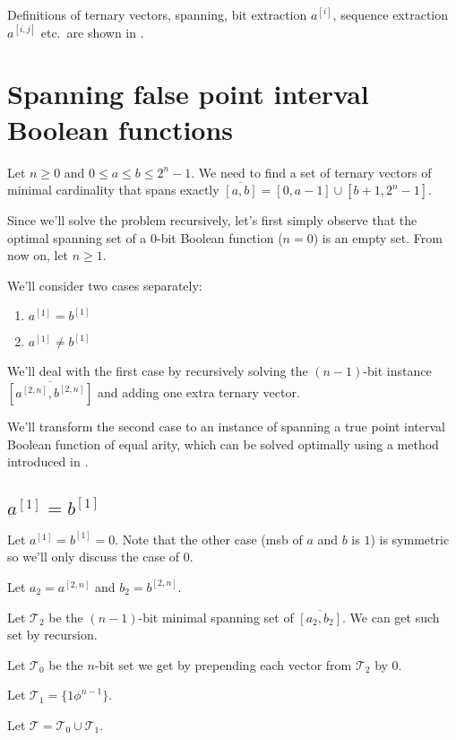 \documentclass{article}
\theoremstyle{plain}
\theoremstyle{definition}
\newcommand{\interval}[2]{[#1, #2]}
\newcommand{\finterval}[2]{\overline{\interval{#1}{#2}}}
\newcommand{\bit}[2]{#1^{[#2]}}
\newcommand{\bits}[3]{#1^{\interval{#2}{#3}}}
\begin{document}
Definitions of
ternary vectors,
spanning,
bit extraction $\bit{a}{i}$,
sequence extraction $\bits{a}{i}{j}$
etc.~are shown in \cite{Schieber2005154}.

\section{Spanning false point interval Boolean functions}
Let $n \geq 0$ and $0 \leq a \leq b \leq 2^n - 1$.
We need to find a set of ternary vectors of minimal cardinality
that spans exactly $\finterval{a}{b} = \interval{0}{a-1} \cup \interval{b+1}{2^n - 1}$.

Since we'll solve the problem recursively,
let's first simply observe that the optimal spanning set of a $0$-bit Boolean function ($n = 0$)
is an empty set.
From now on, let $n \geq 1$.

We'll consider two cases separately:

\begin{enumerate}
\item $\bit{a}{1} = \bit{b}{1}$
\item $\bit{a}{1} \neq \bit{b}{1}$
\end{enumerate}

We'll deal with the first case
by recursively solving the $(n-1)$-bit instance $\finterval{\bits{a}{2}{n}}{\bits{b}{2}{n}}$
and adding one extra ternary vector.

We'll transform the second case
to an instance of spanning a true point interval Boolean function
of equal arity,
which can be solved optimally using a method introduced in \cite{Schieber2005154}.

\subsection{$\bit{a}{1} = \bit{b}{1}$}
Let $\bit{a}{1} = \bit{b}{1} = 0$.
Note that the other case (\acrshort{msb} of $a$ and $b$ is $1$)
is symmetric so we'll only discuss the case of $0$.

Let $a_2 = \bits{a}{2}{n}$ and $b_2 = \bits{b}{2}{n}$.

Let $\mathcal{T}_2$ be the $(n-1)$-bit minimal spanning set of $\finterval{a_2}{b_2}$.
We can get such set by recursion.

Let $\mathcal{T}_0$ be the $n$-bit set we get by prepending each vector from $\mathcal{T}_2$ by $0$.

Let $\mathcal{T}_1 = \{ 1 \phi^{n-1} \}$.

Let $\mathcal{T} = \mathcal{T}_0 \cup \mathcal{T}_1$.
\end{document}
